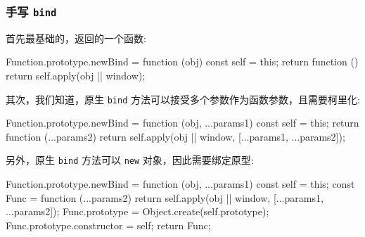 \subsubsection*{手写 \texttt{bind}}

首先最基础的，返回的一个函数:

\begin{JavaScript}
Function.prototype.newBind = function (obj) {
  const self = this;
  return function () {
    return self.apply(obj || window);
  }
}
\end{JavaScript}

其次，我们知道，原生 \texttt{bind} 方法可以接受多个参数作为函数参数，且需要柯里化:

\begin{JavaScript}
Function.prototype.newBind = function (obj, ...params1) {
  const self = this;
  return function (...params2) {
    return self.apply(obj || window, [...params1, ...params2]);
  }
}
\end{JavaScript}

另外，原生 \texttt{bind} 方法可以 \texttt{new} 对象，因此需要绑定原型:

\begin{JavaScript}
Function.prototype.newBind = function (obj, ...params1) {
  const self = this;
  const Func =  function (...params2) {
    return self.apply(obj || window, [...params1, ...params2]);
  }
  Func.prototype = Object.create(self.prototype);
  Func.prototype.constructor = self;
  return Func;
}
\end{JavaScript}